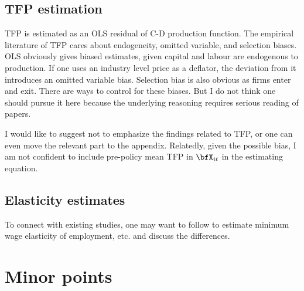 \subsection{TFP estimation}

TFP is estimated as an OLS residual of C-D production function. The empirical literature of TFP cares about endogeneity, omitted variable, and selection biases. OLS obviously gives biased estimates, given capital and labour are endogenous to production. If one uses an industry level price as a deflator, the deviation from it introduces an omitted variable bias. Selection bias is also obvious as firms enter and exit. There are ways to control for these biases. But I do not think one should pursue it here because the underlying reasoning requires serious reading of papers. 

I would like to suggest not to emphasize the findings related to TFP, or one can even move the relevant part to the appendix. Relatedly, given the possible bias, I am not confident to include pre-policy mean TFP in $\bfX_{it}$ in the estimating equation.

\subsection{Elasticity estimates}

To connect with existing studies, one may want to follow \citet{HarasztosiLindner2019} to estimate minimum wage elasticity of employment, etc. and discuss the differences.




\section{Minor points}

